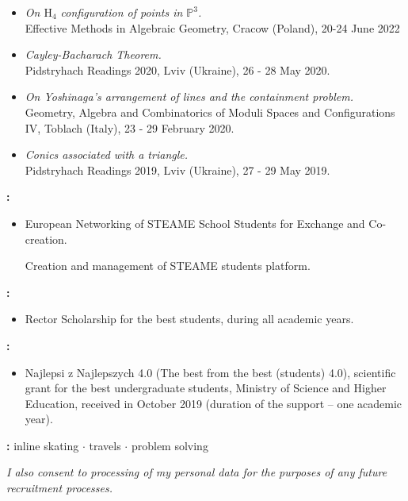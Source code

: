 \documentclass[11pt]{article}
\begin{document}

\noindent
{\bf{}}
\begin{itemize}

    \item  {\it On $\mathrm{H}_4$ configuration of points in $\mathbb{P}^3$.} \\  Effective Methods in Algebraic Geometry, Cracow (Poland),  20-24 June 2022

    \item  {\it Cayley-Bacharach Theorem.} \\ Pidstryhach Readings 2020, Lviv (Ukraine), 26 - 28 May 2020.

    \item  {\it On Yoshinaga's arrangement of lines and the containment problem.} \\ Geometry, Algebra and Combinatorics of Moduli Spaces and Configurations IV, Toblach (Italy), 23 - 29 February 2020.

    \item  {\it Conics associated with a triangle.} \\ Pidstryhach Readings 2019, Lviv (Ukraine), 27 - 29 May 2019.

\end{itemize}

{\bf{:}}
\begin{itemize}
    \item European Networking of STEAME School Students for Exchange and Co-creation.

          Creation and management of STEAME students platform.
\end{itemize}

\noindent
{\bf{:}}

\begin{itemize}
    \item Rector Scholarship for the best students, during all academic years.
\end{itemize}
\noindent


{\bf{:}}
\begin{itemize}
    \item Najlepsi z Najlepszych 4.0 (The best from the best (students) 4.0), scientific grant for the best undergraduate students, Ministry of Science and Higher Education, received in October 2019 (duration of the support -- one academic year).
\end{itemize}
\noindent

{\bf{:}}
inline skating $\cdot$ travels $\cdot$ problem solving
\noindent

\vfill
{\color{black!30}\textit{I also consent to processing of my personal data for the purposes of any future recruitment processes.}}
\phantom{turn the page}
\end{document}
